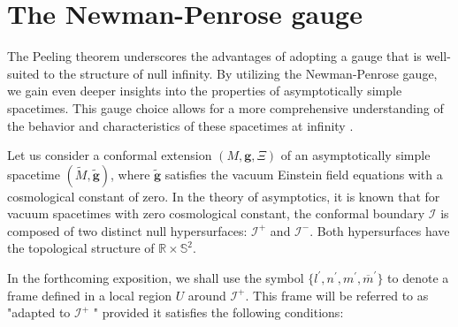 \section{The Newman-Penrose gauge}
\label{sec:The Newman-Penrose gauge}

The Peeling theorem underscores the advantages of adopting a gauge that is well-suited to the structure of null infinity. By utilizing the Newman-Penrose gauge, we gain even deeper insights into the properties of asymptotically simple spacetimes. This gauge choice allows for a more comprehensive understanding of the behavior and characteristics of these spacetimes at infinity \cite{Val16}. 

Let us consider a conformal extension $(M, \boldsymbol{g}, \Xi)$ of an asymptotically simple spacetime $(\tilde{M}, \tilde{\boldsymbol{g}})$, where $\tilde{\boldsymbol{g}}$ satisfies the vacuum Einstein field equations with a cosmological constant of zero. In the theory of asymptotics, it is known that for vacuum spacetimes with zero cosmological constant, the conformal boundary $\mathscr{I}$ is composed of two distinct null hypersurfaces: $\mathscr{I}^+$ and $\mathscr{I}^-$. Both hypersurfaces have the topological structure of $\mathbb{R} \times  \mathbb{S}^2$.

In the forthcoming exposition, we shall use the symbol $\{l^{\prime}, n^{\prime}, m^{\prime}, \overline{m}^{\prime}\}$ to denote a frame defined in a local region $U$ around $\mathscr{I}^+$. This frame will be referred to as "adapted to $\mathscr{I}^+$ " provided it satisfies the following conditions:

